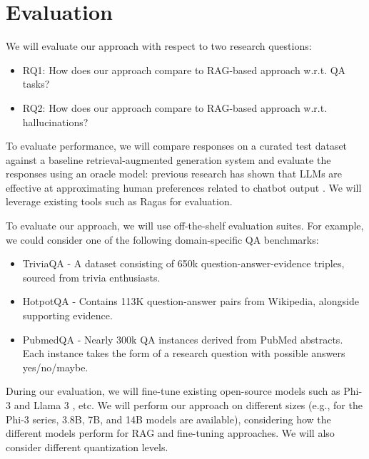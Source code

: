 \section{Evaluation}
We will evaluate our approach with respect to two research questions:

\begin{itemize}
\item RQ1: How does our approach compare to RAG-based approach w.r.t. QA tasks?
\item RQ2: How does our approach compare to RAG-based approach w.r.t. hallucinations?
\end{itemize}

To evaluate performance, we will compare responses on a curated test dataset
against a baseline retrieval-augmented generation system and evaluate the
responses using an oracle model: previous research has shown that LLMs are
effective at approximating human preferences related to chatbot output
\citep{zheng_judging_2023}. We will leverage existing tools such as Ragas
\citep{ragas} for evaluation.

To evaluate our approach, we will use off-the-shelf evaluation suites. For example, we could consider one of the following domain-specific QA benchmarks:

\begin{itemize}
\item TriviaQA \citep{joshi_triviaqa_2017} - A dataset consisting of 650k question-answer-evidence triples, sourced from trivia enthusiasts.
\item HotpotQA \citep{yang_hotpotqa_2018} - Contains 113K question-answer pairs from Wikipedia, alongside supporting evidence.
\item PubmedQA \citep{jin_pubmedqa_2019} - Nearly 300k QA instances derived from PubMed abstracts. Each instance takes the form of a research question with possible answers yes/no/maybe.
\end{itemize}

During our evaluation, we will fine-tune existing open-source models such as
Phi-3 \citep{abdin_phi-3_2024} and Llama 3 \citep{dubey_llama_2024}, etc. We
will perform our approach on different sizes (e.g., for the Phi-3 series, 3.8B,
7B, and 14B models are available), considering how the different models perform
for RAG and fine-tuning approaches. We will also consider different quantization
levels.
